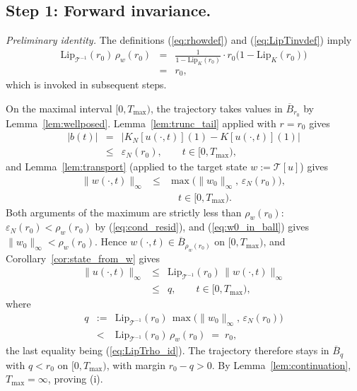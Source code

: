 \documentclass[amsthm]{autart}
\theoremstyle{plain}
\theoremstyle{definition}
\newcommand{\Tcal}{\mathcal{T}}
\newcommand{\Lipk}{\mathrm{Lip}_K}
\newcommand{\LipT}{\mathrm{Lip}_{\Tcal^{-1}}}
\newcommand{\Bball}{\overline{B}}
\newcommand{\eps}{\varepsilon}
\begin{document}
\subsection*{Step 1: Forward invariance.}

\emph{Preliminary identity.} The definitions (\ref{eq:rhowdef}) and (\ref{eq:LipTinvdef}) imply
\begin{eqnarray}
\LipT(r_0)\,\rho_w(r_0) &=& \frac{1}{1 - \Lipk(r_0)}\cdot r_0\bigl(1 - \Lipk(r_0)\bigr) \nonumber \\
&=& r_0,
\label{eq:LipTrho_id}
\end{eqnarray}
which is invoked in subsequent steps.

On the maximal interval $[0, T_{\max})$, the trajectory takes values in $\overline B_{r_0}$ by Lemma~\ref{lem:wellposed}. Lemma~\ref{lem:trunc_tail} applied with $r = r_0$ gives
\begin{eqnarray}
|b(t)| &=& |K_N[u(\cdot,t)](1) - K[u(\cdot,t)](1)| \nonumber \\
&\le& \eps_N(r_0), \qquad t \in [0, T_{\max}),
\label{eq:bbound_invariant}
\end{eqnarray}
and Lemma~\ref{lem:transport} (applied to the target state $w := \Tcal[u]$) gives
\begin{eqnarray}
\|w(\cdot, t)\|_\infty &\le& \max\bigl(\|w_0\|_\infty,\, \eps_N(r_0)\bigr), \nonumber \\
&& \quad t \in [0, T_{\max}).
\label{eq:wnorm_invariant}
\end{eqnarray}
Both arguments of the maximum are strictly less than $\rho_w(r_0)$: $\eps_N(r_0) < \rho_w(r_0)$ by (\ref{eq:cond_resid}), and (\ref{eq:w0_in_ball}) gives $\|w_0\|_\infty < \rho_w(r_0)$. Hence $w(\cdot, t) \in \Bball_{\rho_w(r_0)}$ on $[0, T_{\max})$, and Corollary~\ref{cor:state_from_w} gives
\begin{eqnarray}
\|u(\cdot, t)\|_\infty &\le& \LipT(r_0)\,\|w(\cdot, t)\|_\infty \nonumber \\
&\le& q, \qquad t \in [0, T_{\max}),
\label{eq:unorm_strict}
\end{eqnarray}
where
\begin{eqnarray}
q &:=& \LipT(r_0)\,\max\bigl(\|w_0\|_\infty,\, \eps_N(r_0)\bigr) \nonumber \\
&<& \LipT(r_0)\,\rho_w(r_0) \;=\; r_0,
\label{eq:qdef}
\end{eqnarray}
the last equality being (\ref{eq:LipTrho_id}). The trajectory therefore stays in $\overline B_q$ with $q < r_0$ on $[0, T_{\max})$, with margin $r_0 - q > 0$. By Lemma~\ref{lem:continuation}, $T_{\max} = \infty$, proving (i).
\end{document}
